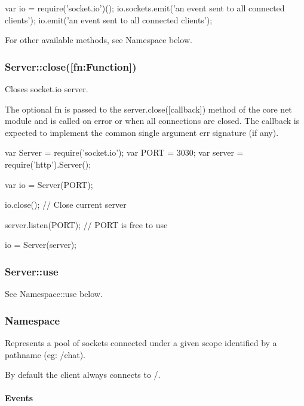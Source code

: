 \begin{DoxyCode}
var io = require('socket.io')();
io.sockets.emit('an event sent to all connected clients');
io.emit('an event sent to all connected clients');
\end{DoxyCode}


For other available methods, see {\ttfamily Namespace} below.

\subsubsection*{Server\+::close(\mbox{[}fn\+:\+Function\mbox{]})}

Closes socket.\+io server.

The optional {\ttfamily fn} is passed to the {\ttfamily server.\+close(\mbox{[}callback\mbox{]})} method of the core {\ttfamily net} module and is called on error or when all connections are closed. The callback is expected to implement the common single argument {\ttfamily err} signature (if any).


\begin{DoxyCode}
var Server = require('socket.io');
var PORT   = 3030;
var server = require('http').Server();

var io = Server(PORT);

io.close(); // Close current server

server.listen(PORT); // PORT is free to use

io = Server(server);
\end{DoxyCode}


\subsubsection*{Server\+::use}

See {\ttfamily Namespace\+::use} below.

\subsubsection*{Namespace}

Represents a pool of sockets connected under a given scope identified by a pathname (eg\+: {\ttfamily /chat}).

By default the client always connects to {\ttfamily /}.

\paragraph*{Events}


